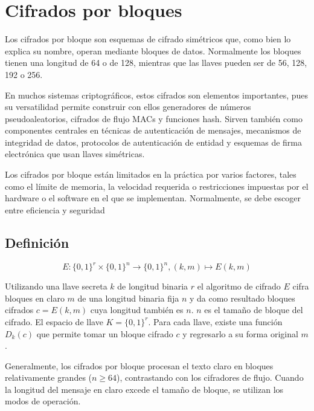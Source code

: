 %
%

\newpage
\section{Cifrados por bloques}

Los cifrados por bloque son esquemas de cifrado simétricos que, como bien 
lo explica su nombre, operan mediante bloques de datos. Normalmente los 
bloques tienen una longitud de 64 o de 128, mientras que las llaves 
pueden ser de 56, 128, 192 o 256.

En muchos sistemas criptográficos, estos cifrados son elementos 
importantes, pues su versatilidad permite construir con ellos 
generadores de números pseudoaleatorios, cifrados de flujo MACs y 
funciones hash. Sirven también como componentes centrales en técnicas de 
autenticación de mensajes, mecanismos de integridad de datos, protocolos 
de autenticación de entidad y esquemas de firma electrónica que usan 
llaves simétricas. 

Los cifrados por bloque están limitados en la práctica por varios 
factores, tales como el límite de memoria, la velocidad requerida o 
restricciones impuestas por el hardware o el software en el que se 
implementan. Normalmente, se debe escoger entre eficiencia y seguridad

\subsection{Definición}

\begin{equation}
  \label{cifrado_bloques_def}
 	E: \{0,1\}^r \times \{0,1\}^n \longrightarrow \{0,1\}^n, (k,m) 
	\longmapsto  E(k,m)
\end{equation}


Utilizando una llave secreta $k$ de longitud binaria $r$ el algoritmo de 
cifrado $E$ cifra bloques en claro $m$ de una longitud binaria fija $n$ y 
da como resultado bloques cifrados $c = E (k,m)$ cuya longitud también es 
$n$. $n$ es el tamaño de bloque del cifrado. 
El espacio de llave $K = \{0,1\}^r$. Para cada llave, existe una función 
$D_k(c)$ que permite tomar un bloque cifrado $c$ y regresarlo a su forma 
original $m$.

Generalmente, los cifrados por bloque procesan el texto claro en bloques 
relativamente grandes ($n \geq 64$), contrastando con los cifradores de 
flujo. Cuando la longitud del mensaje en claro excede el tamaño de 
bloque, se utilizan los modos de operación.

